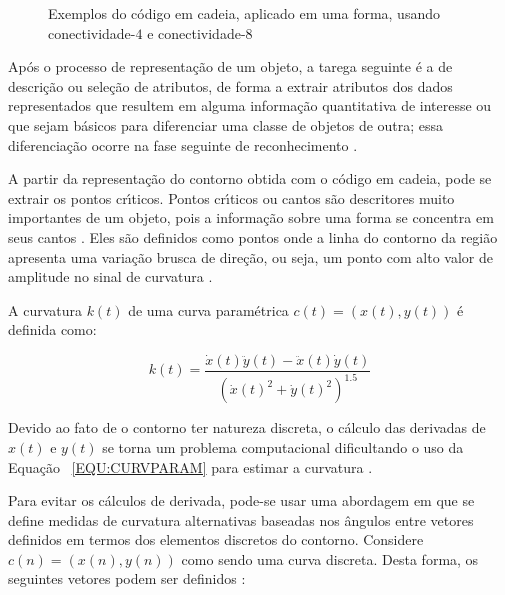 \begin{figure}[h]
\centering
{}
\caption[Exemplos do c\'{o}digo em cadeia aplicado em uma forma]{Exemplos do c\'{o}digo em cadeia, aplicado em uma forma, usando conectividade-$4$ e conectividade-$8$ } \label{FIG:EXEMPLOCCODE}

\end{figure}

Ap\'{o}s o processo de representa\c{c}\~{a}o de um objeto, a tarega seguinte \'{e} a de descri\c{c}\~{a}o ou sele\c{c}\~{a}o de atributos, de forma a extrair atributos dos dados representados que resultem em alguma informa\c{c}\~{a}o quantitativa de interesse ou que sejam b\'{a}sicos para diferenciar uma classe de objetos de outra; essa diferencia\c{c}\~{a}o ocorre na fase seguinte de reconhecimento \cite{HIGASHIMO:2006}.

A partir da representa\c{c}\~{a}o do contorno obtida com o c\'{o}digo em cadeia, pode se extrair os pontos cr\'{\i}ticos. Pontos cr\'{\i}ticos ou cantos s\~{a}o descritores muito importantes de um objeto, pois a informa\c{c}\~{a}o sobre uma forma se concentra em seus cantos \cite{MASOOD:2007}. Eles s\~{a}o definidos como pontos onde a linha do contorno da regi\~{a}o apresenta uma varia\c{c}\~{a}o brusca de dire\c{c}\~{a}o, ou seja, um ponto com alto valor de amplitude no sinal de curvatura \cite{AUZUIR:2005}.

A curvatura $k(t)$ de uma curva param\'{e}trica $c(t) = (x(t), y(t))$ \'{e} definida como:

\begin{equation}
k(t) = \frac{\dot{x}(t)\ddot{y}(t) - \ddot{x}(t)\dot{y}(t)}{(\dot{x}(t)^{2} + \dot{y}(t)^{2})^{1.5}}
\label{EQU:CURVPARAM}
\end{equation}

Devido ao fato de o contorno ter natureza discreta, o c\'{a}lculo das derivadas de $x(t)$ e $y(t)$ se torna um problema computacional dificultando o uso da Equa\c{c}\~{a}o ~\ref{EQU:CURVPARAM} para estimar a curvatura \cite{COSTA:2001}.

Para evitar os c\'{a}lculos de derivada, pode-se usar uma abordagem em que se define medidas de curvatura alternativas baseadas nos \^{a}ngulos entre vetores definidos em termos dos elementos discretos do contorno. Considere $c(n) = (x(n),y(n))$ como sendo uma curva discreta. Desta forma, os seguintes vetores podem ser definidos \cite{COSTA:2001}:

